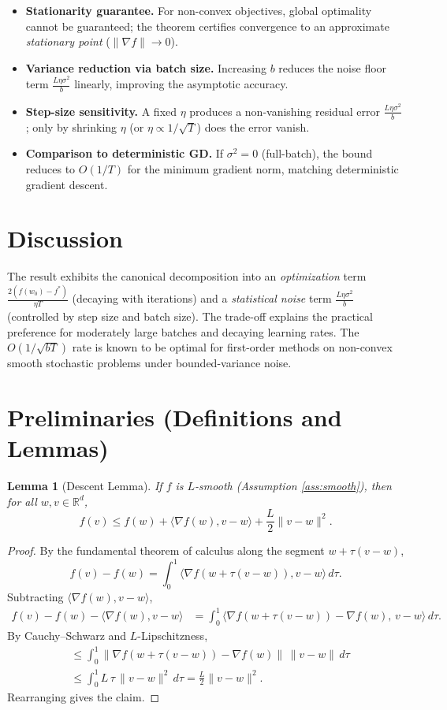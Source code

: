 \documentclass{article}
\newtheorem{lemma}{Lemma}
\begin{document}
\begin{itemize}
    \item \textbf{Stationarity guarantee.} For non-convex objectives, global optimality cannot be guaranteed; the theorem certifies convergence to an approximate \emph{stationary point} ($\|\nabla f\| \to 0$).
    \item \textbf{Variance reduction via batch size.} Increasing $b$ reduces the noise floor term $\frac{L\eta\sigma^2}{b}$ linearly, improving the asymptotic accuracy.
    \item \textbf{Step-size sensitivity.} A fixed $\eta$ produces a non-vanishing residual error $\frac{L\eta\sigma^2}{b}$; only by shrinking $\eta$ (or $\eta\propto 1/\sqrt{T}$) does the error vanish.
    \item \textbf{Comparison to deterministic GD.} If $\sigma^2 = 0$ (full-batch), the bound reduces to $O(1/T)$ for the minimum gradient norm, matching deterministic gradient descent.
\end{itemize}

\section*{Discussion}

The result exhibits the canonical decomposition into an \emph{optimization} term $\tfrac{2(f(w_0)-f^*)}{\eta T}$ (decaying with iterations) and a \emph{statistical noise} term $\tfrac{L\eta\sigma^2}{b}$ (controlled by step size and batch size). The trade-off explains the practical preference for moderately large batches and decaying learning rates. The $O(1/\sqrt{bT})$ rate is known to be optimal for first-order methods on non-convex smooth stochastic problems under bounded-variance noise.

\section*{Preliminaries (Definitions and Lemmas)}

\begin{lemma}[Descent Lemma]\label{lem:descent}
If $f$ is $L$-smooth (Assumption \ref{ass:smooth}), then for all $w, v \in \mathbb{R}^d$,
\[
f(v) \leq f(w) + \langle \nabla f(w), v - w \rangle + \frac{L}{2}\|v - w\|^2.
\]
\end{lemma}

\begin{proof}
By the fundamental theorem of calculus along the segment $w + \tau(v-w)$,
\[
f(v) - f(w) = \int_0^1 \langle \nabla f(w + \tau(v-w)), v - w\rangle \, d\tau.
\]
Subtracting $\langle \nabla f(w), v-w\rangle$,
\begin{align*}
f(v) - f(w) - \langle \nabla f(w), v-w\rangle
&= \int_0^1 \langle \nabla f(w+\tau(v-w)) - \nabla f(w),\, v-w\rangle\, d\tau.
\end{align*}
By Cauchy--Schwarz and $L$-Lipschitzness,
\begin{align*}
&\leq \int_0^1 \|\nabla f(w+\tau(v-w)) - \nabla f(w)\| \, \|v-w\| \, d\tau \\
&\leq \int_0^1 L\,\tau\,\|v-w\|^2 \, d\tau = \frac{L}{2}\|v-w\|^2.
\end{align*}
Rearranging gives the claim.
\end{proof}
\end{document}
